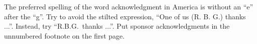 \documentclass[a4paper,10pt,oneside]{article}
\begin{document}
\begin{sloppy}
The preferred spelling of the word acknowledgment in America is without an ``e'' after the ``g''. Try to avoid the stilted expression, ``One of us (R. B. G.) thanks ...''. Instead, try ``R.B.G.\ thanks ...''. Put sponsor acknowledgments in the unnumbered footnote on the first page.



%
% 
%
% 

\end{sloppy}
\end{document}
